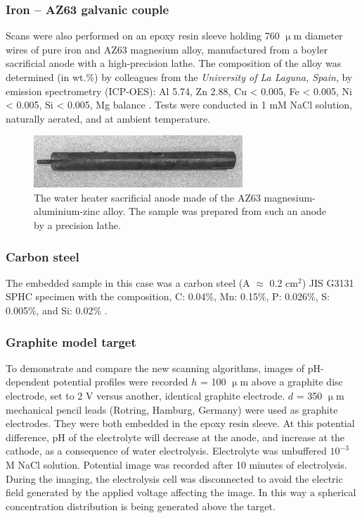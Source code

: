 			\subsubsection{Iron -- AZ63 galvanic couple}
Scans were also performed on an epoxy resin sleeve holding 760 $\upmu$m diameter wires of pure iron and AZ63 magnesium alloy, manufactured from a boyler sacrificial anode with a high-precision lathe.
The composition of the alloy was determined (in wt.\%) by colleagues from the \emph{University of La Laguna, Spain}, by emission spectrometry (ICP-OES): Al 5.74, Zn 2.88, Cu < 0.005, Fe < 0.005, Ni < 0.005, Si < 0.005, Mg balance \cite{souto2013spatially}.
Tests were conducted in 1 mM NaCl solution, naturally aerated, and at ambient temperature.

\begin{figure}
\centering
\includegraphics[width=0.7\textwidth]{img/az63.jpg}
\caption{The water heater sacrificial anode made of the AZ63 magnesium-aluminium-zinc alloy.
The sample was prepared from such an anode by a precision lathe.}
\label{fig:az63}
\end{figure}
			
			\subsubsection{Carbon steel}
The embedded sample in this case was a carbon steel (A $\approx$ 0.2 cm$^2$) JIS G3131 SPHC specimen with the composition, C: 0.04\%, Mn: 0.15\%, P: 0.026\%, S: 0.005\%, and Si: 0.02\% \cite{el2016secm}.

			\subsubsection{Graphite model target}
To demonstrate and compare the new scanning algorithms, images of pH-de\-pen\-dent potential profiles were recorded $h$ = 100 $\upmu$m above a graphite disc electrode, set to 2 V versus another, identical graphite electrode.
$d$ = 350 $\upmu$m mechanical pencil leads (Rotring, Hamburg, Germany) were used as graphite electrodes.
They were both embedded in the epoxy resin sleeve.
At this potential difference, pH of the electrolyte will decrease at the anode, and increase at the cathode, as a consequence of water electrolysis.
Electrolyte was unbuffered $10^{-3}$ M NaCl solution.
Potential image was recorded after 10 minutes of electrolysis.
During the imaging, the electrolysis cell was disconnected to avoid the electric field generated by the applied voltage affecting the image.
In this way a spherical concentration distribution is being generated above the target.

